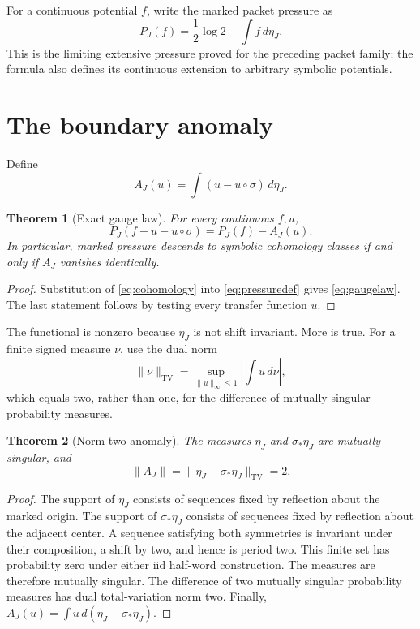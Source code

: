 \documentclass[11pt]{article}
\newtheorem{theorem}{Theorem}[section]
\begin{document}
For a continuous potential $f$, write the marked packet pressure as
\begin{equation}\label{eq:pressuredef}
 P_J(f)=\frac12\log2-\int f\,d\eta_J.
\end{equation}
This is the limiting extensive pressure proved for the preceding packet
family; the formula also defines its continuous extension to arbitrary
symbolic potentials.

\section{The boundary anomaly}

Define
\begin{equation}\label{eq:anomaly}
 A_J(u)=\int (u-u\circ\sigma)\,d\eta_J.
\end{equation}

\begin{theorem}[Exact gauge law]\label{thm:gauge}
For every continuous $f,u$,
\begin{equation}\label{eq:gaugelaw}
 P_J(f+u-u\circ\sigma)=P_J(f)-A_J(u).
\end{equation}
In particular, marked pressure descends to symbolic cohomology classes if
and only if $A_J$ vanishes identically.
\end{theorem}

\begin{proof}
Substitution of \eqref{eq:cohomology} into \eqref{eq:pressuredef} gives
\eqref{eq:gaugelaw}.  The last statement follows by testing every transfer
function $u$.
\end{proof}

The functional is nonzero because $\eta_J$ is not shift invariant.  More is
true.  For a finite signed measure $\nu$, use the dual norm
\[
 \lVert\nu\rVert_{\mathrm{TV}}
 =\sup_{\lVert u\rVert_\infty\leq1}\left|\int u\,d\nu\right|,
\]
which equals two, rather than one, for the difference of mutually singular
probability measures.

\begin{theorem}[Norm-two anomaly]\label{thm:normtwo}
The measures $\eta_J$ and $\sigma_*\eta_J$ are mutually singular, and
\begin{equation}\label{eq:normtwo}
 \lVert A_J\rVert
 =\lVert\eta_J-\sigma_*\eta_J\rVert_{\mathrm{TV}}=2.
\end{equation}
\end{theorem}

\begin{proof}
The support of $\eta_J$ consists of sequences fixed by reflection about the
marked origin.  The support of $\sigma_*\eta_J$ consists of sequences fixed
by reflection about the adjacent center.  A sequence satisfying both
symmetries is invariant under their composition, a shift by two, and hence
is period two.  This finite set has probability zero under either iid
half-word construction.  The measures are therefore mutually singular.
The difference of two mutually singular probability measures has dual
total-variation norm two.  Finally,
$A_J(u)=\int u\,d(\eta_J-\sigma_*\eta_J)$.
\end{proof}
\end{document}
